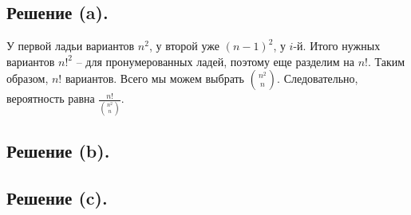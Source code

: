 \documentclass[a4paper, 12pt]{article}
\newcommand{\D}{\displaystyle}
\begin{document}
\begin{spacing}{1}
\subsection{Решение (a).}
У первой ладьи вариантов $n^2$, у второй уже $(n-1)^2$, у $i$-й. Итого нужных вариантов $n!^2$ -- для пронумерованных ладей, поэтому еще разделим на $n!$. Таким образом, $n!$ вариантов. Всего мы можем выбрать $\binom{n^2}{n}$. Следовательно, вероятность равна $\D \frac{n!}{\binom{n^2}{n}}$.
\subsection{Решение (b).}

\subsection{Решение (c).}
\end{spacing}
\end{document}
